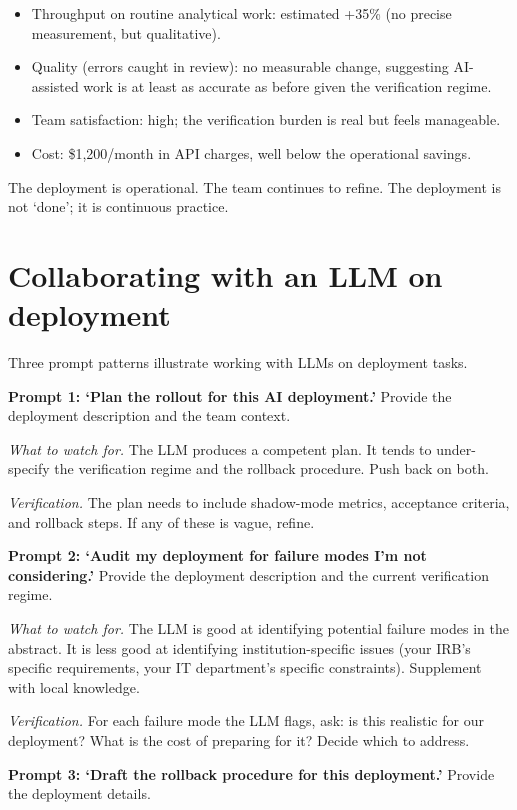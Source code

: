 \documentclass[
  letterpaper,
  11pt]{scrbook}
\providecommand{\tightlist}{%
  \setlength{\itemsep}{0pt}\setlength{\parskip}{0pt}}
\begin{document}
\begin{itemize}
\tightlist
\item
  Throughput on routine analytical work: estimated +35\% (no precise
  measurement, but qualitative).
\item
  Quality (errors caught in review): no measurable change, suggesting
  AI-assisted work is at least as accurate as before given the
  verification regime.
\item
  Team satisfaction: high; the verification burden is real but feels
  manageable.
\item
  Cost: \$1,200/month in API charges, well below the operational
  savings.
\end{itemize}

The deployment is operational. The team continues to refine. The
deployment is not `done'; it is continuous practice.

\section{Collaborating with an LLM on
deployment}\label{collaborating-with-an-llm-on-deployment}

Three prompt patterns illustrate working with LLMs on deployment tasks.

\textbf{Prompt 1: `Plan the rollout for this AI deployment.'} Provide
the deployment description and the team context.

\emph{What to watch for.} The LLM produces a competent plan. It tends to
under-specify the verification regime and the rollback procedure. Push
back on both.

\emph{Verification.} The plan needs to include shadow-mode metrics,
acceptance criteria, and rollback steps. If any of these is vague,
refine.

\textbf{Prompt 2: `Audit my deployment for failure modes I'm not
considering.'} Provide the deployment description and the current
verification regime.

\emph{What to watch for.} The LLM is good at identifying potential
failure modes in the abstract. It is less good at identifying
institution-specific issues (your IRB's specific requirements, your IT
department's specific constraints). Supplement with local knowledge.

\emph{Verification.} For each failure mode the LLM flags, ask: is this
realistic for our deployment? What is the cost of preparing for it?
Decide which to address.

\textbf{Prompt 3: `Draft the rollback procedure for this deployment.'}
Provide the deployment details.
\end{document}
